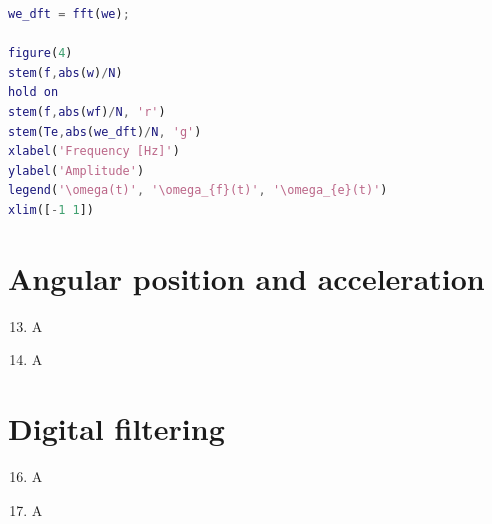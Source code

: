 \documentclass[a4paper,12pt]{article}
\begin{document}
\begin{enumerate}[label={\color{blue}\arabic*)}]
\begin{multicols}{2}
        \columnbreak

        \begin{lstlisting}[style=Matlab-editor,language=Matlab, basicstyle=\small\ttfamily]
we_dft = fft(we);

figure(4)
stem(f,abs(w)/N)
hold on
stem(f,abs(wf)/N, 'r')
stem(Te,abs(we_dft)/N, 'g')
xlabel('Frequency [Hz]')
ylabel('Amplitude')
legend('\omega(t)', '\omega_{f}(t)', '\omega_{e}(t)')
xlim([-1 1])
        \end{lstlisting}
    \end{multicols}

\end{enumerate}

\newpage
\section{Angular position and acceleration}

\begin{enumerate}[label={\color{blue}\arabic*)}]
    \setcounter{enumi}{12}

    \item 
    A
    
    \item 
    A

\end{enumerate}

\newpage
\section{Digital filtering}

\begin{enumerate}[label={\color{blue}\arabic*)}]
    \setcounter{enumi}{15}

    \item 
    A
    
    \item 
    A

\end{enumerate}
\end{document}
